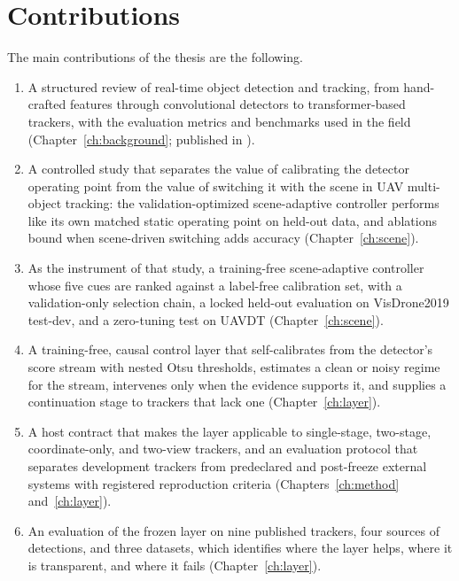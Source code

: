 \section{Contributions}
The main contributions of the thesis are the following.
\begin{enumerate}
\item A structured review of real-time object detection and tracking, from hand-crafted features through convolutional detectors to transformer-based trackers, with the evaluation metrics and benchmarks used in the field (Chapter~\ref{ch:background}; published in \cite{ismail2026realtime}).
\item A controlled study that separates the value of calibrating the detector operating point from the value of switching it with the scene in UAV multi-object tracking: the validation-optimized scene-adaptive controller performs like its own matched static operating point on held-out data, and ablations bound when scene-driven switching adds accuracy (Chapter~\ref{ch:scene}).
\item As the instrument of that study, a training-free scene-adaptive controller whose five cues are ranked against a label-free calibration set, with a validation-only selection chain, a locked held-out evaluation on VisDrone2019 test-dev, and a zero-tuning test on UAVDT (Chapter~\ref{ch:scene}).
\item A training-free, causal control layer that self-calibrates from the detector's score stream with nested Otsu thresholds, estimates a clean or noisy regime for the stream, intervenes only when the evidence supports it, and supplies a continuation stage to trackers that lack one (Chapter~\ref{ch:layer}).
\item A host contract that makes the layer applicable to single-stage, two-stage, coordinate-only, and two-view trackers, and an evaluation protocol that separates development trackers from predeclared and post-freeze external systems with registered reproduction criteria (Chapters~\ref{ch:method} and~\ref{ch:layer}).
\item An evaluation of the frozen layer on nine published trackers, four sources of detections, and three datasets, which identifies where the layer helps, where it is transparent, and where it fails (Chapter~\ref{ch:layer}).
\end{enumerate}

